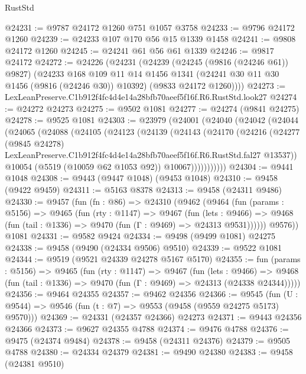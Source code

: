 \begin{lexlean}{RustStd}
\begin{coremodule}
@24231 := @9787 @24172 @1260 @751 @1057 @3758
@24233 := @9796 @24172 @1260
@24239 := @24233 @107 @170 @56 @15 @1339 @1458
@24241 := @9808 @24172 @1260
@24245 := @24241 @61 @56 @61 @1339
@24246 := @9817 @24172
@24272 := @24226
    (@24231
      (@24239
        (@24245 (@9816 (@24246 @61)) @9827)
        (@24233
          @168
          @109
          @11
          @14
          @1456
          @1341
          (@24241 @30 @11 @30 @1456 (@9816 (@24246 @30)) @10392)
          (@9833 @24172 @1260))))
@24273 := LexLeanPreserve.C1b912f4fc4d4e14a28bfb70aeef5f16f.R6.RustStd.look27
@24274 := @24272 @24273
@24275 := @9502 @1081
@24277 := @24274 (@9841 @24275)
@24278 := @9525 @1081
@24303 := @23979
    (@24001
      (@24040
        (@24042
          (@24044
            (@24065
              (@24088
                (@24105
                  (@24123
                    (@24139
                      (@24143
                        (@24170
                          (@24216
                            (@24277
                              (@9845 @24278)
                              LexLeanPreserve.C1b912f4fc4d4e14a28bfb70aeef5f16f.R6.RustStd.fal27
                              @13537))
                          @10054
                          (@5519 (@10059 @62 @1053 @92))
                          @10067)))))))))))
@24304 := @9441 @1048
@24308 := @9443 (@9447 @1048) (@9453 @1048)
@24310 := @9458 (@9422 @9459)
@24311 := @5163 @8378
@24313 := @9458 (@24311 @9486)
@24330 := @9457
    (fun (fn : @86) =>
    @24310
      (@9462
        (@9464
          (fun (params : @5156) =>
          @9465
            (fun (rty : @1147) =>
            @9467
              (fun (lets : @9466) =>
              @9468 (fun (tail : @1336) => @9470 (fun (Γ : @9469) => @24313 @9531))))))
        @9576))
    @1081
@24331 := @9582 @9424
@24334 := @9498 (@9499 @1081) @24275
@24338 := @9458 (@9490 (@24334 @9506) @9510)
@24339 := @9522 @1081
@24344 := @9519 (@9521 @24339 @24278 @5167 @5170)
@24355 := fun (params : @5156) =>
  @9465
    (fun (rty : @1147) =>
    @9467
      (fun (lets : @9466) =>
      @9468 (fun (tail : @1336) => @9470 (fun (Γ : @9469) => @24313 (@24338 @24344)))))
@24356 := @9464 @24355
@24357 := @9462 @24356
@24366 := @9545
    (fun (U : @9544) => @9546 (fun (t : @7) => @9553 (@9458 (@9559 @24275 @5173) @9570)))
@24369 := @24331 (@24357 @24366) @24273
@24371 := @9443 @24356 @24366
@24373 := @9627 @24355 @4788
@24374 := @9476 @4788
@24376 := @9475 (@24374 @9484)
@24378 := @9458 (@24311 @24376)
@24379 := @9505 @4788
@24380 := @24334 @24379
@24381 := @9490 @24380
@24383 := @9458 (@24381 @9510)

\end{coremodule}
\end{lexlean}
